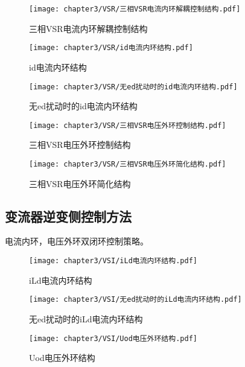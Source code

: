 \begin{figure}[!htp]
	\centering
	\texttt{[image: chapter3/VSR/三相VSR电流内环解耦控制结构.pdf]}
	\caption{三相VSR电流内环解耦控制结构}
	\label{fig:三相VSR电流内环解耦控制结构}
\end{figure}

\begin{figure}[!htp]
	\centering
	\texttt{[image: chapter3/VSR/id电流内环结构.pdf]}
	\caption{id电流内环结构}
	\label{fig:id电流内环结构}
\end{figure}

\begin{figure}[!htp]
	\centering
	\texttt{[image: chapter3/VSR/无ed扰动时的id电流内环结构.pdf]}
	\caption{无ed扰动时的id电流内环结构}
	\label{fig:无ed扰动时的id电流内环结构}
\end{figure}

\begin{figure}[!htp]
	\centering
	\texttt{[image: chapter3/VSR/三相VSR电压外环控制结构.pdf]}
	\caption{三相VSR电压外环控制结构}
	\label{fig:三相VSR电压外环控制结构}
\end{figure}

\begin{figure}[!htp]
	\centering
	\texttt{[image: chapter3/VSR/三相VSR电压外环简化结构.pdf]}
	\caption{三相VSR电压外环简化结构}
	\label{fig:三相VSR电压外环简化结构}
\end{figure}

\subsection{变流器逆变侧控制方法}

电流内环，电压外环双闭环控制策略。

\begin{figure}[!htp]
	\centering
	\texttt{[image: chapter3/VSI/iLd电流内环结构.pdf]}
	\caption{iLd电流内环结构}
	\label{fig:iLd电流内环结构}
\end{figure}

\begin{figure}[!htp]
	\centering
	\texttt{[image: chapter3/VSI/无ed扰动时的iLd电流内环结构.pdf]}
	\caption{无ed扰动时的iLd电流内环结构}
	\label{fig:无ed扰动时的iLd电流内环结构}
\end{figure}

\begin{figure}[!htp]
	\centering
	\texttt{[image: chapter3/VSI/Uod电压外环结构.pdf]}
	\caption{Uod电压外环结构}
	\label{fig:Uod电压外环结构}
\end{figure}

